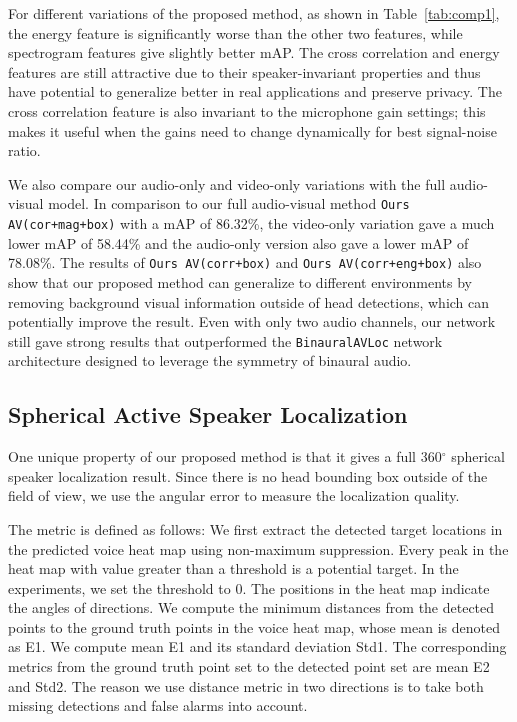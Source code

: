 \documentclass[10pt,twocolumn,letterpaper]{article}
\begin{document}
For different variations of the proposed method, as shown in Table~\ref{tab:comp1}, the energy feature is significantly worse than the other two features, 
while spectrogram features give slightly better mAP. 
The cross correlation and energy features are still attractive due to their speaker-invariant 
properties and thus have potential to generalize better in real applications and preserve privacy. 
The cross correlation feature is also invariant to the microphone gain settings;
this makes it useful when the gains need to change dynamically for best signal-noise ratio.

We also compare our audio-only and video-only variations with the full audio-visual model.
In comparison to our full audio-visual method \texttt{Ours AV(cor+mag+box)} with a mAP of 86.32\%, 
the video-only variation gave a much lower mAP of 58.44\% and the 
audio-only version also gave a lower mAP of 78.08\%. 
The results of \texttt{Ours AV(corr+box)} and  \texttt{Ours AV(corr+eng+box)} also show that our proposed method
can generalize to different environments by removing background visual information outside of head detections,
which can potentially 
improve the result.
Even with only two audio channels, our network still gave strong results that outperformed the \texttt{BinauralAVLoc}
network architecture designed to leverage the symmetry of binaural audio.  


\subsection{Spherical Active Speaker Localization} 

One unique property of our proposed method is that it gives a full 360$^{\circ}$ spherical speaker localization result. 
Since there is no head bounding box outside of the field of view, we use the angular error to 
measure the localization quality. 

The metric is defined as follows:
We first extract the detected target locations in the predicted voice heat map using non-maximum suppression. Every peak in the heat map with value greater than a threshold is a potential target. 
In the experiments, we set the threshold to 0.
The positions in the heat map indicate the angles of directions.
We compute the minimum distances from the detected points to the ground truth points in the voice heat map, 
whose mean is denoted as E1. We compute mean E1 and its standard deviation
Std1. The corresponding metrics from the ground truth point set to the detected point set are mean E2 and Std2. 
The reason we use distance metric in two directions is to take both missing detections and false alarms into account.
\end{document}
